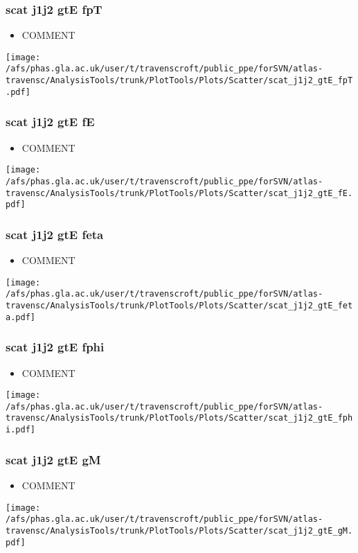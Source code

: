 \documentclass{beamer}
\begin{document}
\begin{frame}
\frametitle{scat j1j2 gtE fpT}
\begin{itemize}
\item COMMENT
\end{itemize}
\begin{center}
\texttt{[image: /afs/phas.gla.ac.uk/user/t/travenscroft/public\_ppe/forSVN/atlas-travensc/AnalysisTools/trunk/PlotTools/Plots/Scatter/scat\_j1j2\_gtE\_fpT.pdf]}
\end{center}
\end{frame}

\begin{frame}
\frametitle{scat j1j2 gtE fE}
\begin{itemize}
\item COMMENT
\end{itemize}
\begin{center}
\texttt{[image: /afs/phas.gla.ac.uk/user/t/travenscroft/public\_ppe/forSVN/atlas-travensc/AnalysisTools/trunk/PlotTools/Plots/Scatter/scat\_j1j2\_gtE\_fE.pdf]}
\end{center}
\end{frame}

\begin{frame}
\frametitle{scat j1j2 gtE feta}
\begin{itemize}
\item COMMENT
\end{itemize}
\begin{center}
\texttt{[image: /afs/phas.gla.ac.uk/user/t/travenscroft/public\_ppe/forSVN/atlas-travensc/AnalysisTools/trunk/PlotTools/Plots/Scatter/scat\_j1j2\_gtE\_feta.pdf]}
\end{center}
\end{frame}

\begin{frame}
\frametitle{scat j1j2 gtE fphi}
\begin{itemize}
\item COMMENT
\end{itemize}
\begin{center}
\texttt{[image: /afs/phas.gla.ac.uk/user/t/travenscroft/public\_ppe/forSVN/atlas-travensc/AnalysisTools/trunk/PlotTools/Plots/Scatter/scat\_j1j2\_gtE\_fphi.pdf]}
\end{center}
\end{frame}

\begin{frame}
\frametitle{scat j1j2 gtE gM}
\begin{itemize}
\item COMMENT
\end{itemize}
\begin{center}
\texttt{[image: /afs/phas.gla.ac.uk/user/t/travenscroft/public\_ppe/forSVN/atlas-travensc/AnalysisTools/trunk/PlotTools/Plots/Scatter/scat\_j1j2\_gtE\_gM.pdf]}
\end{center}
\end{frame}
\end{document}
